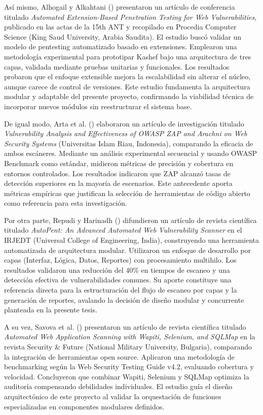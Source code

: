 \documentclass[12pt, a4paper]{article}
\begin{document}
Así mismo, Alhogail y Alkahtani (\citeyear*{alhogail2024}) presentaron un
artículo de conferencia titulado \textit{Automated Extension-Based Penetration
Testing for Web Vulnerabilities}, publicado en las actas de la 15th ANT y
recopilado en Procedia Computer Science (King Saud University, Arabia Saudita).
El estudio buscó validar un modelo de pentesting automatizado basado en extensiones.
Emplearon una metodología experimental para prototipar Kashef bajo una arquitectura
de tres capas, validada mediante pruebas unitarias y funcionales. Los resultados
probaron que el enfoque extensible mejora la escalabilidad sin alterar el núcleo,
aunque carece de control de versiones. Este estudio fundamenta la arquitectura
modular y adaptable del presente proyecto, confirmando la viabilidad técnica de
incorporar nuevos módulos sin reestructurar el sistema base.

De igual modo, Arta et al. (\citeyear*{arta2023}) elaboraron un artículo de
investigación titulado \textit{Vulnerability Analysis and Effectiveness of OWASP
ZAP and Arachni on Web Security Systems} (Universitas Islam Riau, Indonesia),
comparando la eficacia de ambos escáneres. Mediante un análisis experimental
secuencial y usando OWASP Benchmark como estándar, midieron métricas de precisión
y cobertura en entornos controlados. Los resultados indicaron que ZAP alcanzó
tasas de detección superiores en la mayoría de escenarios. Este antecedente aporta
métricas empíricas que justifican la selección de herramientas de código abierto
como referencia para esta investigación.

Por otra parte, Repudi y Harinadh (\citeyear*{repudi2024}) difundieron un artículo
de revista científica titulado \textit{AutoPent: An Advanced Automated Web
Vulnerability Scanner} en el IRJEDT (Universal College of Engineering, India),
construyendo una herramienta automatizada de arquitectura modular. Utilizaron un
enfoque de desarrollo por capas (Interfaz, Lógica, Datos, Reportes) con
procesamiento multihilo. Los resultados validaron una reducción del 40\% en
tiempos de escaneo y una detección efectiva de vulnerabilidades comunes. Su aporte
constituye una referencia directa para la estructuración del flujo de escaneo por
capas y la generación de reportes, avalando la decisión de diseño modular y
concurrente planteada en la presente tesis.

A su vez, Savova et al. (\citeyear*{savova2024}) presentaron un artículo de
revista científica titulado \textit{Automated Web Application Scanning with
Wapiti, Selenium, and SQLMap} en la revista Security \& Future (National Military
University, Bulgaria), comparando la integración de herramientas open source.
Aplicaron una metodología de benchmarking según la Web Security Testing Guide
v4.2, evaluando cobertura y velocidad. Concluyeron que combinar Wapiti, Selenium
y SQLMap optimiza la auditoría compensando debilidades individuales. El estudio
guía el diseño arquitectónico de este proyecto al validar la orquestación de
funciones especializadas en componentes modulares definidos.
\end{document}
